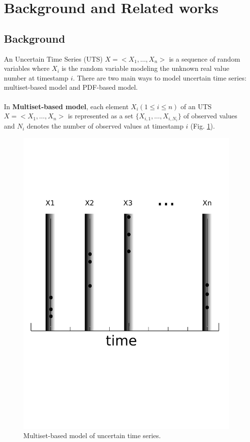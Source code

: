 \section[Background]{Background and Related works}

\subsection{Background}

An Uncertain Time Series (UTS) $X=<X_1, \ldots, X_n>$  is a sequence of random
variables where $X_i$  is the random variable modeling the unknown real value
number at timestamp $i$. There are two main ways to model uncertain time series:
multiset-based model and PDF-based model.   

\paragraph{}In \textbf{Multiset-based model}, each element $X_i (1 \leq i \leq n)$ of an UTS $X = <X_1, \ldots,  X_n>$ is represented as a set $\{X_{i,1}, \ldots, X_{i,N_i}\}$ of observed values and $N_i$
  denotes the number of observed values at timestamp $i$ (Fig. \ref{multiset}).
  
 \begin{figure}[h]
  \centering
   \includegraphics[scale=0.4]{images/multiset2}
    \caption{Multiset-based model of uncertain time series.}
  \label{multiset}
  \end{figure}

